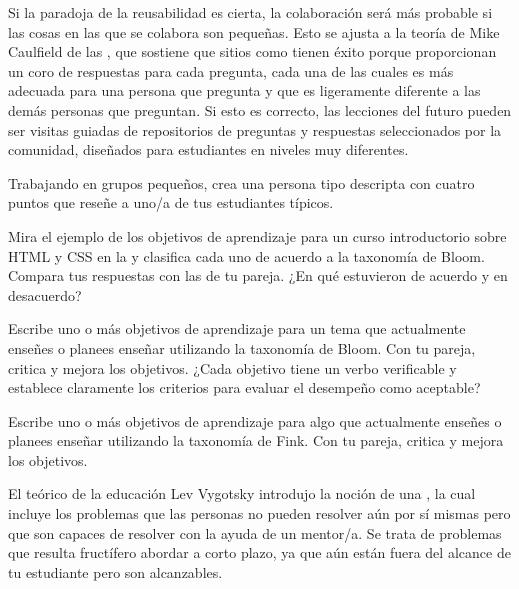 Si la paradoja de la reusabilidad es cierta,
la colaboración será más probable
si las cosas en las que se colabora son pequeñas.
Esto se ajusta a la teoría de Mike Caulfield  de las
,
que sostiene que sitios como
 tienen éxito porque
proporcionan un coro de respuestas para cada pregunta,
cada una de las cuales es más adecuada para
una persona que pregunta y que es ligeramente diferente a las demás personas que preguntan.
Si esto es correcto,
las lecciones del futuro pueden ser visitas guiadas de repositorios
de preguntas y respuestas seleccionados por la comunidad,
diseñados para estudiantes en niveles muy diferentes.
 
 
 
 
Trabajando en grupos pequeños,
crea una persona tipo descripta con cuatro puntos que reseñe a uno/a de tus estudiantes típicos.
 
 
Mira el ejemplo de los objetivos de aprendizaje
para un curso introductorio sobre HTML y CSS
en la 
y clasifica cada uno de acuerdo a la taxonomía de Bloom.
Compara tus respuestas con las de tu pareja.
¿En qué estuvieron de acuerdo y en desacuerdo?
 
 
Escribe uno o más objetivos de aprendizaje
para un tema que actualmente enseñes o planees enseñar
utilizando la taxonomía de Bloom.
Con tu pareja,
critica y mejora los objetivos.
¿Cada objetivo tiene un verbo verificable y establece claramente
los criterios para evaluar el desempeño como aceptable?
 
 
Escribe uno o más objetivos de aprendizaje
para algo que actualmente enseñes o planees enseñar
utilizando la taxonomía de Fink.
Con tu pareja,
critica y mejora los objetivos.
 
 
El teórico de la educación Lev Vygotsky introdujo la noción de una
,
la cual incluye los problemas que las personas no pueden resolver aún por sí mismas
pero que son capaces de resolver con la ayuda de un mentor/a.
Se trata de problemas que resulta fructífero abordar a corto plazo,
ya que aún están fuera del alcance de tu estudiante pero son alcanzables.
 
